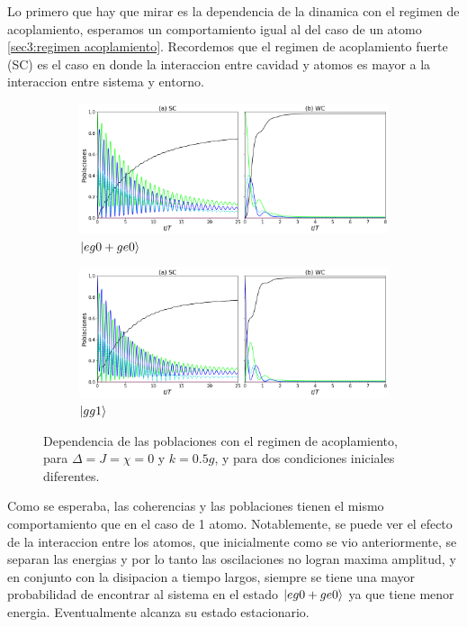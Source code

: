 Lo primero que hay que mirar es la dependencia de la dinamica con el regimen de acoplamiento, esperamos un comportamiento igual al del caso de un atomo \ref{sec3:regimen acoplamiento}. Recordemos que el regimen de acoplamiento fuerte (SC) es el caso en donde la interaccion entre cavidad y atomos es mayor a la interaccion entre sistema y entorno.
\begin{figure}[h]
    \centering
    \begin{subfigure}{0.7\textwidth}
        \includegraphics[width=\textwidth]{figuras/ch4/sc vs wc eg0 k0.5.png}
        \caption{$\ket{eg0+ge0}$}
        \label{fig4:acoplamiento eg0 sim}
    \end{subfigure}
    \vfill
    \begin{subfigure}{0.7\textwidth}
        \includegraphics[width=\textwidth]{figuras/ch4/sc vs wc gg1 k=0.5.png}
        \caption{$\ket{gg1}$}
        \label{fig4:acoplamiento gg1}
    \end{subfigure}
    \caption{Dependencia de las poblaciones con el regimen de acoplamiento, para $\Delta=J=\chi=0$ y $k=0.5g$, y para dos condiciones iniciales diferentes.}
    \label{fig4:regimen acoplamiento}
\end{figure}
Como se esperaba, las coherencias y las poblaciones tienen el mismo comportamiento que en el caso de 1 atomo. Notablemente, se puede ver el efecto de la interaccion entre los atomos, que inicialmente como se vio anteriormente, se separan las energias y por lo tanto las oscilaciones no logran maxima amplitud, y en conjunto con la disipacion a tiempo largos, siempre se tiene una mayor probabilidad de encontrar al sistema en el estado $\ket{eg0+ge0}$ ya que tiene menor energia. Eventualmente alcanza su estado estacionario.

